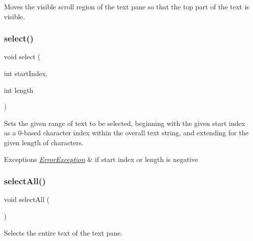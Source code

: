 Moves the visible scroll region of the text pane so that the top part of the text is visible. 

\mbox{\label{classGBrowserPane_aaeb1320c0553d0d2b8081b750f59a34a}} 
\subsubsection{\texorpdfstring{select()}{select()}}
{\footnotesize\ttfamily void select (\begin{DoxyParamCaption}\item[{int}]{start\+Index,  }\item[{int}]{length }\end{DoxyParamCaption})\hspace{0.3cm}{\ttfamily [virtual]}}



Sets the given range of text to be selected, beginning with the given start index as a 0-\/based character index within the overall text string, and extending for the given length of characters. 


\begin{DoxyExceptions}{Exceptions}
{\em \mbox{\hyperlink{classErrorException}{Error\+Exception}}} & if start index or length is negative \\
\hline
\end{DoxyExceptions}
\mbox{\label{classGBrowserPane_ab6658ed404200bd7aaca5629db064645}} 
\subsubsection{\texorpdfstring{select\+All()}{selectAll()}}
{\footnotesize\ttfamily void select\+All (\begin{DoxyParamCaption}{ }\end{DoxyParamCaption})\hspace{0.3cm}{\ttfamily [virtual]}}



Selects the entire text of the text pane. 

\mbox{\label{classGInteractor_ad15f102f62e2960576012f1aa0ba4b2e}} 
